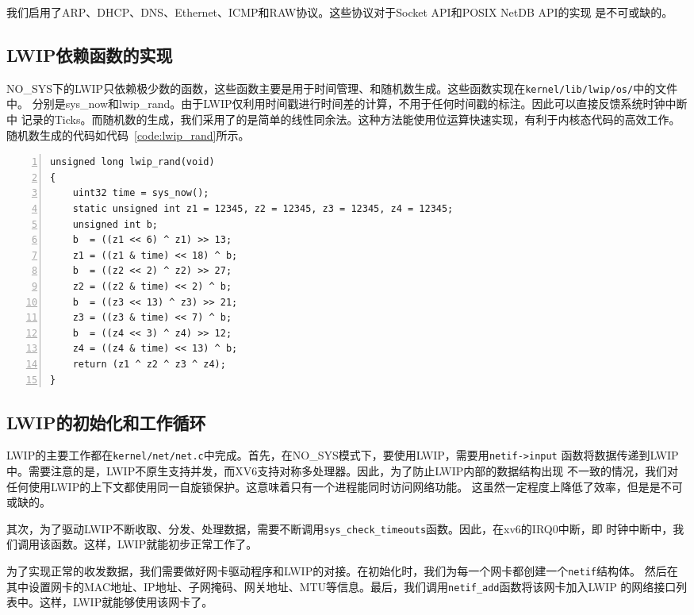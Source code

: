 \documentclass[a4paper,twoside]{ctexrep}
\begin{document}
\begin{spacing}{1.2}
我们启用了ARP、DHCP、DNS、Ethernet、ICMP和RAW协议。这些协议对于Socket API和POSIX NetDB API的实现
是不可或缺的。

\subsection{LWIP依赖函数的实现}

NO\_SYS下的LWIP只依赖极少数的函数，这些函数主要是用于时间管理、和随机数生成。这些函数实现在\texttt{kernel/lib/lwip/os/}中的文件中。
分别是sys\_now和lwip\_rand。由于LWIP仅利用时间戳进行时间差的计算，不用于任何时间戳的标注。因此可以直接反馈系统时钟中断中
记录的Ticks。而随机数的生成，我们采用了的是简单的线性同余法。这种方法能使用位运算快速实现，有利于内核态代码的高效工作。
随机数生成的代码如代码~\ref{code:lwip_rand}所示。
\begin{lstlisting}[numbers=left,style=CppStyle,caption=LWIP随机数生成,label={code:lwip_rand}]
unsigned long lwip_rand(void)
{
	uint32 time = sys_now();
	static unsigned int z1 = 12345, z2 = 12345, z3 = 12345, z4 = 12345;
	unsigned int b;
	b  = ((z1 << 6) ^ z1) >> 13;
	z1 = ((z1 & time) << 18) ^ b;
	b  = ((z2 << 2) ^ z2) >> 27;
	z2 = ((z2 & time) << 2) ^ b;
	b  = ((z3 << 13) ^ z3) >> 21;
	z3 = ((z3 & time) << 7) ^ b;
	b  = ((z4 << 3) ^ z4) >> 12;
	z4 = ((z4 & time) << 13) ^ b;
	return (z1 ^ z2 ^ z3 ^ z4);
}
\end{lstlisting}


\subsection{LWIP的初始化和工作循环}

LWIP的主要工作都在\texttt{kernel/net/net.c}中完成。首先，在NO\_SYS模式下，要使用LWIP，需要用\texttt{netif->input}
函数将数据传递到LWIP中。需要注意的是，LWIP不原生支持并发，而XV6支持对称多处理器。因此，为了防止LWIP内部的数据结构出现
不一致的情况，我们对任何使用LWIP的上下文都使用同一自旋锁保护。这意味着只有一个进程能同时访问网络功能。
这虽然一定程度上降低了效率，但是是不可或缺的。

其次，为了驱动LWIP不断收取、分发、处理数据，需要不断调用\texttt{sys\_check\_timeouts}函数。因此，在xv6的IRQ0中断，即
时钟中断中，我们调用该函数。这样，LWIP就能初步正常工作了。

为了实现正常的收发数据，我们需要做好网卡驱动程序和LWIP的对接。在初始化时，我们为每一个网卡都创建一个\texttt{netif}结构体。
然后在其中设置网卡的MAC地址、IP地址、子网掩码、网关地址、MTU等信息。最后，我们调用\texttt{netif\_add}函数将该网卡加入LWIP
的网络接口列表中。这样，LWIP就能够使用该网卡了。


\end{spacing}
\end{document}
